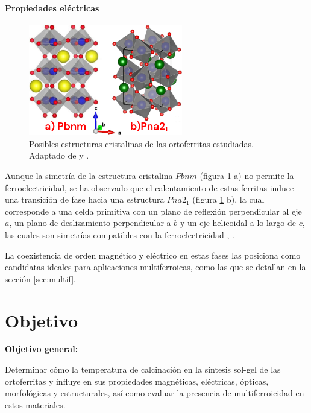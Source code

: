 \documentclass[../main.tex]{subfiles}
\begin{document}
\subsubsection{Propiedades eléctricas}
\begin{figure}[H]
    \centering
    \includegraphics[width=0.6\textwidth]{fig/estructurascristalinas.png}
    \caption{Posibles estructuras cristalinas de las ortoferritas estudiadas. Adaptado de \cite{Herklotz2021} y \cite{Oumertem2019}.}
    \label{fig:estructcrist}
\end{figure}
Aunque la simetría de la estructura cristalina $Pbnm$ (figura \ref{fig:estructcrist} a) no permite la ferroelectricidad, se ha observado que el calentamiento de estas ferritas induce una transición de fase hacia una estructura $Pna2_1$ (figura \ref{fig:estructcrist} b), la cual corresponde a una celda primitiva con un plano de reflexión perpendicular al eje $a$, un plano de deslizamiento perpendicular a $b$ y un eje helicoidal a lo largo de $c$, las cuales son simetrías compatibles con la ferroelectricidad \cite{Zhang2016}, \cite{Rajaitha2022}.

La coexistencia de orden magnético y eléctrico en estas fases las posiciona como candidatas ideales para aplicaciones multiferroicas, como las que se detallan en la sección \ref{sec:multif}.
\chapter{Objetivo}
\textbf{Objetivo general:}

Determinar cómo la temperatura de calcinación en la síntesis sol-gel de las ortoferritas \neod{} y \sama{} influye en sus propiedades magnéticas, eléctricas, ópticas, morfológicas y estructurales, así como evaluar la presencia de multiferroicidad en estos materiales.
\end{document}
